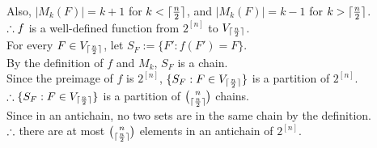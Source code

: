 \begin{pr}
\begin{enumerate}[(i)]
Also, $|M_k(F)|=k+1$ for $k<{\lceil\frac n2\rceil}$, and $|M_k(F)|=k-1$ for $k>{\lceil\frac n2\rceil}$.\\
$\therefore f$ is a well-defined function from $2^{[n]}$ to $V_{\lceil\frac n2\rceil}$.\\
For every $F\in V_{\lceil\frac n2\rceil}$, let $S_F:=\{F':f(F')=F\}$.\\
By the definition of $f$ and $M_k$, $S_F$ is a chain.\\
Since the preimage of $f$ is $2^{[n]}$, $\{S_F:F\in V_{\lceil\frac n2\rceil}\}$ is a partition of $2^{[n]}$.\\
$\therefore\{S_F:F\in V_{\lceil\frac n2\rceil}\}$ is a partition of $\binom n{{\lceil\frac n2\rceil}}$ chains.\\
Since in an antichain, no two sets are in the same chain by the definition.\\
$\therefore$ there are at most $\binom n{{\lceil\frac n2\rceil}}$ elements in an antichain of $2^{[n]}$.
\end{enumerate}
\end{pr}
